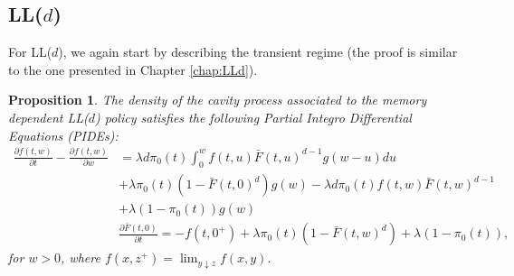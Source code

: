 \documentclass[12pt]{report}
\newtheorem{proposition}[theorem]{Proposition}
\begin{document}
\subsection{LL($d$)}
For LL($d$), we again start by describing the transient regime (the proof is similar to the one presented in Chapter \ref{chap:LLd}).
\begin{proposition}\label{prop:PIDE}
The density of the cavity process associated to the memory dependent LL($d$) policy satisfies the following Partial Integro Differential Equations (PIDEs):
\begin{align}
\frac{\partial f(t,w)}{\partial t} - \frac{\partial f(t,w)}{\partial w} &= \lambda d \pi_0(t)\int_0^w f(t,u) \bar F(t,u)^{d-1} g(w-u) du \nonumber\\
& + \lambda \pi_0(t) (	1-\bar F(t,0)^d) g(w) - \lambda d \pi_0(t) f(t,w)\bar F(t,w)^{d-1}\nonumber \\
& + \lambda (1-\pi_0(t)) g(w) \label{eq:PIDE1_2}\\
&\frac{\partial \bar F(t,0)}{\partial t} = -f(t,0^+) + \lambda \pi_0(t) (1-\bar F(t,w)^d) + \lambda (1-\pi_0(t)),\label{eq:PIDE2_2}
\end{align}
for $w>0$, where $f(x,z^+) = \lim_{y \downarrow z} f(x,y)$.
\end{proposition}
\end{document}
